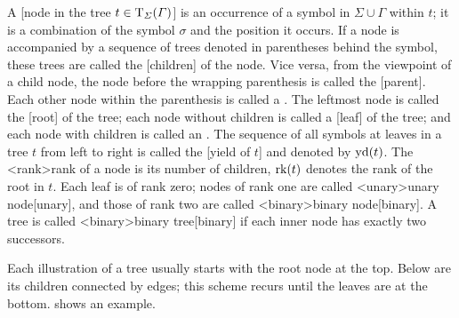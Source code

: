 \documentclass[../document.tex]{subfiles}
\begin{document}
    A [node in the tree \(t \in \operatorname{T}_\varSigma(\varGamma)\)] is an occurrence of a symbol in \(\varSigma \cup \varGamma\) within \(t\); it is a combination of the symbol \(\sigma\) and the position it occurs.
    If a node is accompanied by a sequence of trees denoted in parentheses behind the symbol, these trees are called the [children] of the node.
    Vice versa, from the viewpoint of a child node, the node before the wrapping parenthesis is called the [parent].
    Each other node within the parenthesis is called a .
    The leftmost node is called the [root] of the tree; each node without children is called a [leaf] of the tree; and each node with children is called an .
    The sequence of all symbols at leaves in a tree \(t\) from left to right is called the [yield of \(t\)] and denoted by \(\operatorname{yd}(t)\).
    The <rank>{rank of a node} is its number of children, \(\operatorname{rk}(t)\) denotes the rank of the root in \(t\).
    Each leaf is of rank zero; nodes of rank one are called <unary>{unary node}[unary], and those of rank two are called <binary>{binary node}[binary].
    A tree is called <binary>{binary tree}[binary] if each inner node has exactly two successors.

    Each illustration of a tree usually starts with the root node at the top. Below are its children connected by edges; this scheme recurs until the leaves are at the bottom.
     shows an example.
\end{document}
